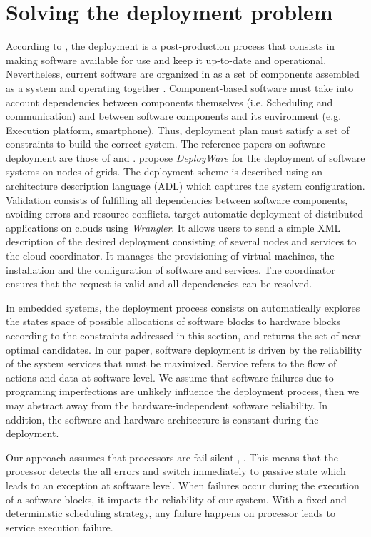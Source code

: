 \documentclass[3p,times,procedia,authoryear,round]{elsarticle}
\begin{document}
\section{Solving the deployment problem}
\label{DeploymentQualityMeasure}
According to \citep{Arcangeli2015198}, the deployment is a post-production process that consists in making software available for use and keep it up-to-date and operational. Nevertheless,  current software are organized in as a set of components assembled as a system and operating together \citep{Carlson2006127}. Component-based software must take into account dependencies between components themselves  (i.e. Scheduling and communication) and between software components and its environment (e.g. Execution platform, smartphone). Thus, deployment plan must satisfy a set of constraints to build the correct system. The reference papers on software deployment are those of \citep{Flissi2008} and  \citep{Juve2011}. \citep{Flissi2008} propose \emph{DeployWare} for the deployment of software systems  on nodes of grids. The deployment scheme is described using an architecture description language (ADL) which captures the system configuration. Validation consists of fulfilling all dependencies between software components, avoiding errors and resource conflicts. \citep{Juve2011} target automatic deployment of distributed applications on clouds using \emph{Wrangler}. It allows users to send a simple XML description of the desired deployment consisting of several nodes and services to the cloud coordinator. It manages the provisioning of virtual machines, the installation and the configuration of software and services. The coordinator ensures that the request is valid and all dependencies can be resolved.


In embedded systems, the deployment process consists on automatically explores the states space of possible allocations of software blocks to hardware blocks according to the constraints addressed in this section, and returns the set of near-optimal candidates. In our paper, software deployment is driven by the reliability of the system services that must be maximized. Service refers to the flow of actions and data at software level. We assume that software failures due to programing imperfections are unlikely influence the deployment process, then we may abstract away from the hardware-independent software reliability. In addition, the software and hardware architecture is constant during the deployment.

Our approach assumes that processors are fail silent \citep{Meedeniya2011835}, \citep{HeinerT98}. This means that the processor detects the all errors and switch immediately to passive state which leads to an exception at software level. When failures occur during the execution of a software blocks, it impacts the reliability of our system. With a fixed and deterministic scheduling strategy, any failure happens on processor leads to service execution failure.  
\end{document}

